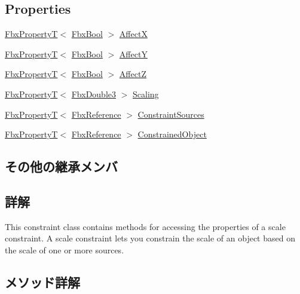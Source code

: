 \subsection*{Properties}
\begin{DoxyCompactItemize}
\item 
\hyperlink{class_fbx_property_t}{Fbx\+PropertyT}$<$ \hyperlink{fbxtypes_8h_a92e0562b2fe33e76a242f498b362262e}{Fbx\+Bool} $>$ \hyperlink{class_fbx_constraint_scale_a41d95ab4643d154a400efa926062ffac}{AffectX}
\item 
\hyperlink{class_fbx_property_t}{Fbx\+PropertyT}$<$ \hyperlink{fbxtypes_8h_a92e0562b2fe33e76a242f498b362262e}{Fbx\+Bool} $>$ \hyperlink{class_fbx_constraint_scale_a2249bbb0bd5ba9507fa82e1b66c0b2a2}{AffectY}
\item 
\hyperlink{class_fbx_property_t}{Fbx\+PropertyT}$<$ \hyperlink{fbxtypes_8h_a92e0562b2fe33e76a242f498b362262e}{Fbx\+Bool} $>$ \hyperlink{class_fbx_constraint_scale_af8cc6e516ff4b87331fc12f20af6f235}{AffectZ}
\item 
\hyperlink{class_fbx_property_t}{Fbx\+PropertyT}$<$ \hyperlink{fbxtypes_8h_ae0a96f14cde566774c7553aa7523b7a7}{Fbx\+Double3} $>$ \hyperlink{class_fbx_constraint_scale_a0c8bd160ee16da64bf998a612bb11a5b}{Scaling}
\item 
\hyperlink{class_fbx_property_t}{Fbx\+PropertyT}$<$ \hyperlink{fbxtypes_8h_a44df6a2eec915cf27cd481e5c5e48a24}{Fbx\+Reference} $>$ \hyperlink{class_fbx_constraint_scale_a434954eedd1e80d6935881b37e9da11f}{Constraint\+Sources}
\item 
\hyperlink{class_fbx_property_t}{Fbx\+PropertyT}$<$ \hyperlink{fbxtypes_8h_a44df6a2eec915cf27cd481e5c5e48a24}{Fbx\+Reference} $>$ \hyperlink{class_fbx_constraint_scale_ae5eb43970ba98186d43fdb51498b21c5}{Constrained\+Object}
\end{DoxyCompactItemize}
\subsection*{その他の継承メンバ}


\subsection{詳解}
This constraint class contains methods for accessing the properties of a scale constraint. A scale constraint lets you constrain the scale of an object based on the scale of one or more sources. 

\subsection{メソッド詳解}
\mbox{\label{class_fbx_constraint_scale_a876e788ab98cf2fe1042ae3c687b3689}} 
